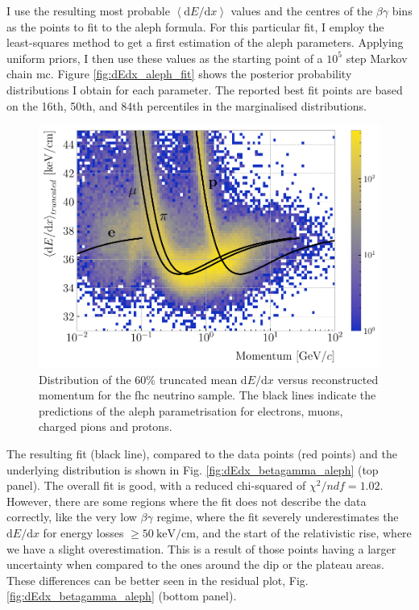 I use the resulting most probable $\left<\mathrm{d}E/\mathrm{d}x\right>$ values and the centres of the $\beta\gamma$ bins as the points to fit to the \gls{aleph} formula. For this particular fit, I employ the least-squares method to get a first estimation of the \gls{aleph} parameters. Applying uniform priors, I then use these values as the starting point of a $10^{5}$ step Markov chain \gls{mc}. Figure \ref{fig:dEdx_aleph_fit} shows the posterior probability distributions I obtain for each parameter. The reported best fit points are based on the 16th, 50th, and 84th percentiles in the marginalised distributions.

\begin{figure}[t]
	\centering
	\includegraphics[width=.90\linewidth]{Images/GArSoft_PID/dEdx/dEdx_curves_with_fit.pdf}
	\caption[Distribution of the $60\%$ truncated mean $\mathrm{d}E/\mathrm{d}x$ versus reconstructed momentum for the \gls{fhc} neutrino sample.]{Distribution of the $60\%$ truncated mean $\mathrm{d}E/\mathrm{d}x$ versus reconstructed momentum for the \gls{fhc} neutrino sample. The black lines indicate the predictions of the \gls{aleph} parametrisation for electrons, muons, charged pions and protons.}
	\label{fig:dEdx_vs_momentum}
\end{figure}

The resulting fit (black line), compared to the data points (red points) and the underlying distribution is shown in Fig. \ref{fig:dEdx_betagamma_aleph} (top panel). The overall fit is good, with a reduced chi-squared of $\chi^{2}/ndf=1.02$. However, there are some regions where the fit does not describe the data correctly, like the very low $\beta\gamma$ regime, where the fit severely underestimates the $\mathrm{d}E/\mathrm{d}x$ for energy losses $\geq 50 ~ \mathrm{keV}/\mathrm{cm}$, and the start of the relativistic rise, where we have a slight overestimation. This is a result of those points having a larger uncertainty when compared to the ones around the dip or the plateau areas. These differences can be better seen in the residual plot, Fig. \ref{fig:dEdx_betagamma_aleph} (bottom panel).

